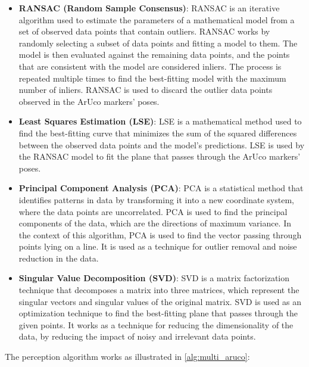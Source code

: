\begin{itemize}
    \item \textbf{RANSAC (Random Sample Consensus)}: RANSAC is an iterative algorithm used to estimate
    the parameters of a mathematical model from a set of observed data points that contain outliers.
    RANSAC works by randomly selecting a subset of data points and fitting a model to them. The model is then
    evaluated against the remaining data points, and the points that are consistent with the model are considered
    inliers. The process is repeated multiple times to find the best-fitting model with the maximum number of inliers.
    RANSAC is used to discard the outlier data points observed in the ArUco markers' poses.
    \item \textbf{Least Squares Estimation (LSE)}: LSE is a mathematical method used to find the best-fitting curve
    that minimizes the sum of the squared differences between the observed data points and the model's predictions.
    LSE is used by the RANSAC model to fit the plane that passes through the ArUco markers' poses.
    \item \textbf{Principal Component Analysis (PCA)}: PCA is a statistical method that identifies patterns
    in data by transforming it into a new coordinate system, where the data points are uncorrelated.
    PCA is used to find the principal components of the data, which are the directions of maximum variance.
    In the context of this algorithm, PCA is used to find the vector passing through points lying on a line.
    It is used as a technique for outlier removal and noise reduction in the data.
    \item \textbf{Singular Value Decomposition (SVD)}: SVD is a matrix factorization technique that decomposes
    a matrix into three matrices, which represent the singular vectors and singular values of the original matrix.
    SVD is used as an optimization technique to find the best-fitting plane that passes through the given points.
    It works as a technique for reducing the dimensionality of the data, by reducing the impact of noisy
    and irrelevant data points.
\end{itemize}

The perception algorithm works as illustrated in \ref{alg:multi_aruco}:

